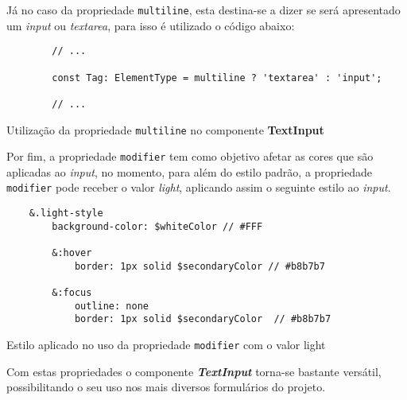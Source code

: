 Já no caso da propriedade \texttt{multiline}, esta destina-se a dizer se será apresentado um \textit{input} ou \textit{textarea}, para isso é utilizado o código abaixo:

\begin{longlisting}
	\begin{verbatim}
		// ...

		const Tag: ElementType = multiline ? 'textarea' : 'input';

		// ...
	\end{verbatim}

	\caption{Utilização da propriedade \texttt{multiline} no componente \textbf{TextInput}}
\end{longlisting}

Por fim, a propriedade \texttt{modifier} tem como objetivo afetar as cores que são aplicadas ao \textit{input}, no momento, para além do estilo padrão, a propriedade \texttt{modifier} pode receber o valor \textit{light}, aplicando assim o seguinte estilo ao \textit{input}.

\begin{longlisting}
	\begin{verbatim}
	&.light-style
		background-color: $whiteColor // #FFF

		&:hover
			border: 1px solid $secondaryColor // #b8b7b7

		&:focus
			outline: none
			border: 1px solid $secondaryColor  // #b8b7b7
	\end{verbatim}

	\caption{Estilo aplicado no uso da propriedade \texttt{modifier} com o valor light}
\end{longlisting}

Com estas propriedades o componente \textit{\textbf{TextInput}} torna-se bastante versátil, possibilitando o seu uso nos mais diversos formulários do projeto.